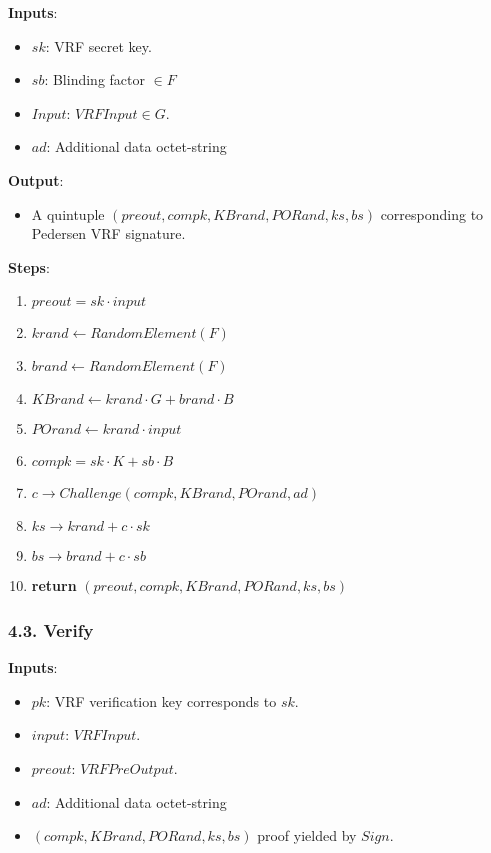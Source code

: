 \documentclass[
]{article}
\providecommand{\tightlist}{%
  \setlength{\itemsep}{0pt}\setlength{\parskip}{0pt}}
\begin{document}
\textbf{Inputs}:

\begin{itemize}
\tightlist
\item
  \(sk\): VRF secret key.
\item
  \(sb\): Blinding factor \(\in F\)
\item
  \(Input\): \(VRFInput \in G\).
\item
  \(ad\): Additional data octet-string
\end{itemize}

\textbf{Output}:

\begin{itemize}
\tightlist
\item
  A quintuple \((preout, compk, KBrand, PORand, ks, bs)\) corresponding
  to Pedersen VRF signature.
\end{itemize}

\textbf{Steps}:

\begin{enumerate}
\def\labelenumi{\arabic{enumi}.}
\tightlist
\item
  \(preout = sk \cdot input\)
\item
  \(krand \leftarrow RandomElement(F)\)
\item
  \(brand \leftarrow RandomElement(F)\)
\item
  \(KBrand \leftarrow krand \cdot G + brand \cdot B\)
\item
  \(POrand \leftarrow krand \cdot input\)
\item
  \(compk = sk \cdot K + sb \cdot B\)
\item
  \(c \rightarrow Challenge(compk, KBrand, POrand, ad)\)
\item
  \(ks \rightarrow krand + c \cdot sk\)
\item
  \(bs \rightarrow brand + c \cdot sb\)
\item
  \textbf{return} \((preout, compk, KBrand, PORand, ks, bs)\)
\end{enumerate}

\hypertarget{verify-1}{%
\subsubsection{4.3. Verify}\label{verify-1}}

\textbf{Inputs}:

\begin{itemize}
\tightlist
\item
  \(pk\): VRF verification key corresponds to \(sk\).
\item
  \(input\): \(VRFInput\).
\item
  \(preout\): \(VRFPreOutput\).
\item
  \(ad\): Additional data octet-string
\item
  \((compk, KBrand, PORand, ks, bs)\) proof yielded by \(Sign\).
\end{itemize}
\end{document}
